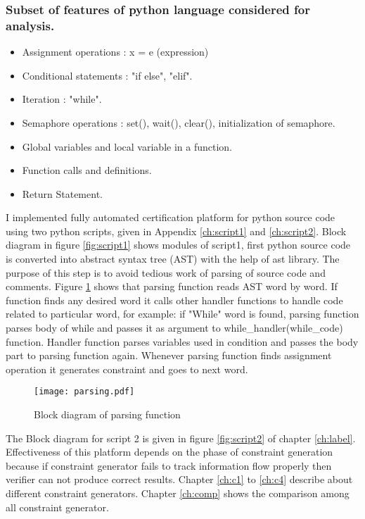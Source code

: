 \subsubsection{\textbf{Subset of features of python language considered for analysis.}}
\begin{itemize}
	\item Assignment operations : x = e (expression)
	\item Conditional statements : "if else", "elif". \item Iteration : "while".
	\item Semaphore operations : set(), wait(), clear(), initialization of semaphore.
	\item Global variables and local variable in a function.
	\item Function calls and definitions.
	\item Return Statement.	 
\end{itemize}
I implemented fully automated certification platform for python source code  using two python scripts, given in Appendix \ref{ch:script1} and \ref{ch:script2}. Block diagram in figure \ref{fig:script1} shows modules of script1, first python source code is converted into abstract syntax tree (AST) with the help of ast library. The purpose of this step is to avoid tedious work of parsing of source code and comments. Figure \ref{fig:parsing} shows that parsing function reads AST word by word. If function finds any desired word it calls other handler functions to handle code related to particular word, for example: if "While" word is found, parsing function parses body of while and passes it as argument to while\_handler(while\_code) function. Handler function parses variables used in condition and passes the body part to parsing function again. Whenever parsing function finds assignment operation it generates constraint and goes to next word.     
\begin{figure}
	\texttt{[image: parsing.pdf]}
	\centering
	\caption{Block diagram of parsing function}
	\label{fig:parsing}
\end{figure}
The Block diagram for script 2 is given in figure \ref{fig:script2} of chapter \ref{ch:label}. 
Effectiveness of this platform depends on the phase of constraint generation because if constraint generator fails to track information flow properly then verifier can not produce correct results. Chapter \ref{ch:c1} to \ref{ch:c4} describe about different constraint generators. Chapter \ref{ch:comp} shows the comparison among all constraint generator.  
